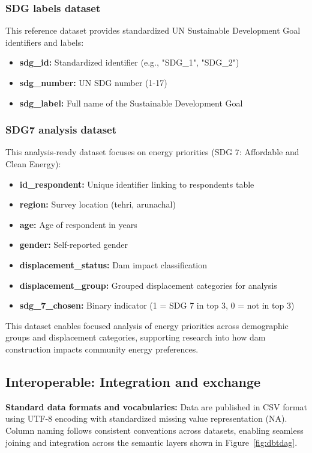 \subsubsection{SDG labels dataset}

This reference dataset provides standardized UN Sustainable Development Goal identifiers and labels:
\begin{itemize}
  \item \textbf{sdg\_id:} Standardized identifier (e.g., "SDG\_1", "SDG\_2")
  \item \textbf{sdg\_number:} UN SDG number (1-17)
  \item \textbf{sdg\_label:} Full name of the Sustainable Development Goal
\end{itemize}

\subsubsection{SDG7 analysis dataset}

This analysis-ready dataset focuses on energy priorities (SDG 7: Affordable and Clean Energy):
\begin{itemize}
  \item \textbf{id\_respondent:} Unique identifier linking to respondents table
  \item \textbf{region:} Survey location (tehri, arunachal)
  \item \textbf{age:} Age of respondent in years
  \item \textbf{gender:} Self-reported gender
  \item \textbf{displacement\_status:} Dam impact classification
  \item \textbf{displacement\_group:} Grouped displacement categories for analysis
  \item \textbf{sdg\_7\_chosen:} Binary indicator (1 = SDG 7 in top 3, 0 = not in top 3)
\end{itemize}

This dataset enables focused analysis of energy priorities across demographic groups and displacement categories, supporting research into how dam construction impacts community energy preferences.

\subsection{Interoperable: Integration and exchange}

\textbf{Standard data formats and vocabularies:} Data are published in CSV format \cite{csv_rfc} using UTF-8 encoding with standardized missing value representation (NA). Column naming follows consistent conventions across datasets, enabling seamless joining and integration across the semantic layers shown in Figure~\ref{fig:dbtdag}.


